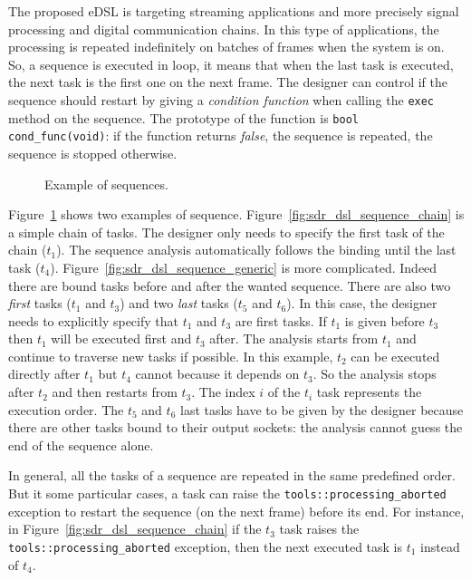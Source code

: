 The proposed eDSL is targeting streaming applications and more precisely signal
processing and digital communication chains. In this type of applications, the
processing is repeated indefinitely on batches of frames when the system is on.
So, a sequence is executed in loop, it means that when the last task is
executed, the next task is the first one on the next frame. The designer can
control if the sequence should restart by giving a \emph{condition function}
when calling the \verb|exec| method on the sequence. The prototype of the
function is \verb|bool cond_func(void)|: if the function returns \emph{false},
the sequence is repeated, the sequence is stopped otherwise.

\begin{figure}[htp]
  \centering
  \quad
  \caption{Example of sequences.}
  \label{fig:sdr_dsl_sequence}
\end{figure}

Figure~\ref{fig:sdr_dsl_sequence} shows two examples of sequence.
Figure~\ref{fig:sdr_dsl_sequence_chain} is a simple chain of tasks. The designer
only needs to specify the first task of the chain ($t_1$). The sequence analysis
automatically follows the binding until the last task ($t_4$).
Figure~\ref{fig:sdr_dsl_sequence_generic} is more complicated. Indeed there are
bound tasks before and after the wanted sequence. There are also two
\emph{first} tasks ($t_1$ and $t_3$) and two \emph{last} tasks ($t_5$ and
$t_6$). In this case, the designer needs to explicitly specify that $t_1$ and
$t_3$ are first tasks. If $t_1$ is given before $t_3$ then $t_1$ will be
executed first and $t_3$ after. The analysis starts from $t_1$ and continue to
traverse new tasks if possible. In this example, $t_2$ can be executed directly
after $t_1$ but $t_4$ cannot because it depends on $t_3$. So the analysis stops
after $t_2$ and then restarts from $t_3$. The index $i$ of the $t_i$ task
represents the execution order. The $t_5$ and $t_6$ last tasks have to be given
by the designer because there are other tasks bound to their output sockets: the
analysis cannot guess the end of the sequence alone.

In general, all the tasks of a sequence are repeated in the same predefined
order. But it some particular cases, a task can raise the
\verb|tools::processing_aborted| exception to restart the sequence (on the next
frame) before its end. For instance, in Figure~\ref{fig:sdr_dsl_sequence_chain}
if the $t_3$ task raises the \verb|tools::processing_aborted| exception, then
the next executed task is $t_1$ instead of $t_4$.

